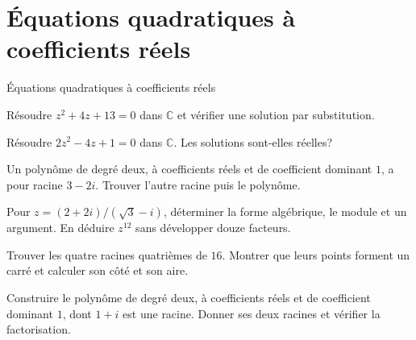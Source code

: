 \section{Équations quadratiques à coefficients réels}
\label{workbook:section:complexes.08}
\begin{exerciseblock}{Équations quadratiques à coefficients réels}
\item Résoudre $z^2+4z+13=0$ dans $\mathbb C$ et vérifier une solution par substitution.
\item Résoudre $2z^2-4z+1=0$ dans $\mathbb C$. Les solutions sont-elles réelles?
\item Un polynôme de degré deux, à coefficients réels et de coefficient dominant $1$, a pour racine $3-2i$. Trouver l'autre racine puis le polynôme.
\end{exerciseblock}

\begin{synthesisbox}
\item Pour $z=(2+2i)/(\sqrt3-i)$, déterminer la forme algébrique, le module et un argument. En déduire $z^{12}$ sans développer douze facteurs.
\item Trouver les quatre racines quatrièmes de $16$. Montrer que leurs points forment un carré et calculer son côté et son aire.
\item Construire le polynôme de degré deux, à coefficients réels et de coefficient dominant $1$, dont $1+i$ est une racine. Donner ses deux racines et vérifier la factorisation.
\end{synthesisbox}
